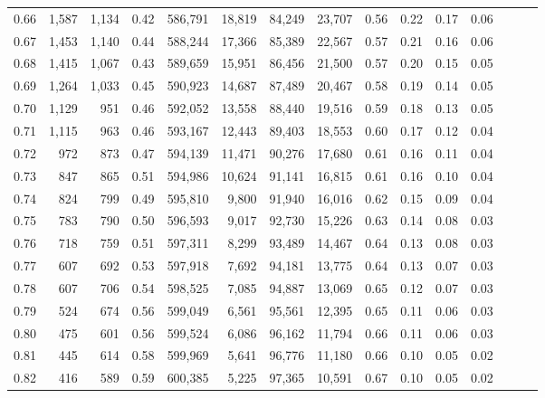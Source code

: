 \begin{tabular}{rrrrrrrrrrrrrrr}
0.66 &   1,587 &  1,134 &  0.42 &  586,791 &   18,819 &   84,249 &   23,707 &  0.56 &  0.22 &  0.17 &      0.06 \\
0.67 &   1,453 &  1,140 &  0.44 &  588,244 &   17,366 &   85,389 &   22,567 &  0.57 &  0.21 &  0.16 &      0.06 \\
0.68 &   1,415 &  1,067 &  0.43 &  589,659 &   15,951 &   86,456 &   21,500 &  0.57 &  0.20 &  0.15 &      0.05 \\
0.69 &   1,264 &  1,033 &  0.45 &  590,923 &   14,687 &   87,489 &   20,467 &  0.58 &  0.19 &  0.14 &      0.05 \\
0.70 &   1,129 &    951 &  0.46 &  592,052 &   13,558 &   88,440 &   19,516 &  0.59 &  0.18 &  0.13 &      0.05 \\
0.71 &   1,115 &    963 &  0.46 &  593,167 &   12,443 &   89,403 &   18,553 &  0.60 &  0.17 &  0.12 &      0.04 \\
0.72 &     972 &    873 &  0.47 &  594,139 &   11,471 &   90,276 &   17,680 &  0.61 &  0.16 &  0.11 &      0.04 \\
0.73 &     847 &    865 &  0.51 &  594,986 &   10,624 &   91,141 &   16,815 &  0.61 &  0.16 &  0.10 &      0.04 \\
0.74 &     824 &    799 &  0.49 &  595,810 &    9,800 &   91,940 &   16,016 &  0.62 &  0.15 &  0.09 &      0.04 \\
0.75 &     783 &    790 &  0.50 &  596,593 &    9,017 &   92,730 &   15,226 &  0.63 &  0.14 &  0.08 &      0.03 \\
0.76 &     718 &    759 &  0.51 &  597,311 &    8,299 &   93,489 &   14,467 &  0.64 &  0.13 &  0.08 &      0.03 \\
0.77 &     607 &    692 &  0.53 &  597,918 &    7,692 &   94,181 &   13,775 &  0.64 &  0.13 &  0.07 &      0.03 \\
0.78 &     607 &    706 &  0.54 &  598,525 &    7,085 &   94,887 &   13,069 &  0.65 &  0.12 &  0.07 &      0.03 \\
0.79 &     524 &    674 &  0.56 &  599,049 &    6,561 &   95,561 &   12,395 &  0.65 &  0.11 &  0.06 &      0.03 \\
0.80 &     475 &    601 &  0.56 &  599,524 &    6,086 &   96,162 &   11,794 &  0.66 &  0.11 &  0.06 &      0.03 \\
0.81 &     445 &    614 &  0.58 &  599,969 &    5,641 &   96,776 &   11,180 &  0.66 &  0.10 &  0.05 &      0.02 \\
0.82 &     416 &    589 &  0.59 &  600,385 &    5,225 &   97,365 &   10,591 &  0.67 &  0.10 &  0.05 &      0.02 \\

\end{tabular}
